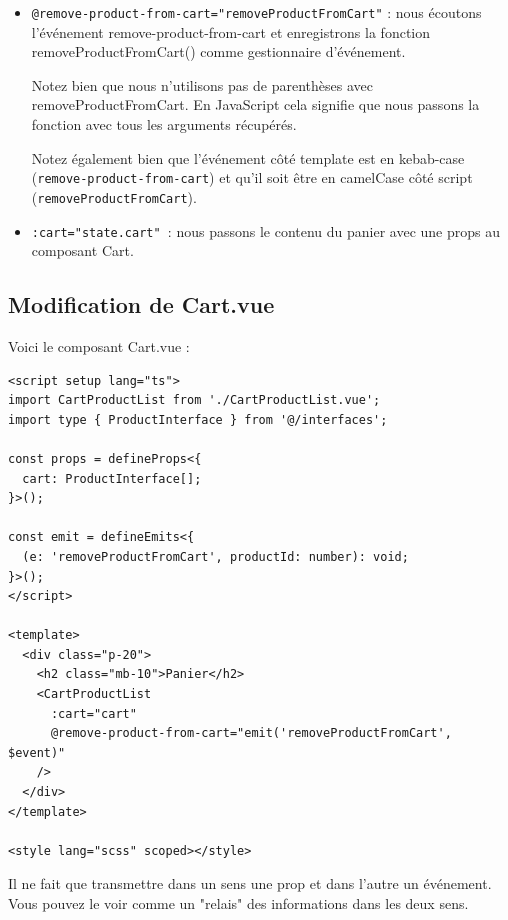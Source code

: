 \documentclass{article}
\begin{document}
\begin{itemize}
\item {\tt @remove-product-from-cart="removeProductFromCart"} : nous écoutons l'événement {\color{monOrange}remove-product-from-cart} et enregistrons la fonction {\color{monOrange}removeProductFromCart()} comme gestionnaire d'événement.

Notez bien que nous n'utilisons pas de parenthèses avec {\color{monOrange}removeProductFromCart}. En JavaScript cela signifie que nous passons la fonction avec tous les arguments récupérés.

Notez également bien que l'événement côté {\color{monOrange}template} est en {\color{monOrange}kebab-case} ({\tt remove-product-from-cart}) et qu'il soit être en {\color{monOrange}camelCase} côté script ({\tt removeProductFromCart}).

\item {\tt :cart="state.cart" }: nous passons le contenu du panier avec une {\color{monOrange}props} au composant {\color{monOrange}Cart}.
\end{itemize}
\subsection{Modification de {\color{monOrange}Cart.vue}}
Voici le composant {\color{monOrange}Cart.vue} :
\begin{verbatim}
<script setup lang="ts">
import CartProductList from './CartProductList.vue';
import type { ProductInterface } from '@/interfaces';

const props = defineProps<{
  cart: ProductInterface[];
}>();

const emit = defineEmits<{
  (e: 'removeProductFromCart', productId: number): void;
}>();
</script>

<template>
  <div class="p-20">
    <h2 class="mb-10">Panier</h2>
    <CartProductList
      :cart="cart"
      @remove-product-from-cart="emit('removeProductFromCart', $event)"
    />
  </div>
</template>

<style lang="scss" scoped></style>
\end{verbatim}
Il ne fait que transmettre dans un sens une {\color{monOrange}prop} et dans l'autre un événement. Vous pouvez le voir comme un "relais" des informations dans les deux sens.
\end{document}
